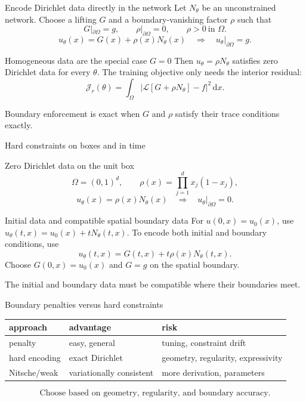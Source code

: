 \documentclass[aspectratio=43,11pt]{beamer}
\newcommand{\slideid}{L3}
\newcommand{\dd}{\,\mathrm d}
\newcommand{\Lop}{\mathcal{L}}
\newcommand{\Loss}{\mathcal{J}}
\newcommand{\labnote}[1]{{\scriptsize\color{courseBlue}#1\par}}
\begin{document}
\renewcommand{\slideid}{L3-S049}
\begin{frame}[c]{Encode Dirichlet data directly in the network}
\small
Let $N_\theta$ be an unconstrained network. Choose a lifting $G$ and a
boundary-vanishing factor $\rho$ such that
\[
G|_{\partial\Omega}=g,\qquad \rho|_{\partial\Omega}=0,
\qquad \rho>0\ \text{in }\Omega.
\]
\[
\boxed{u_\theta(x)=G(x)+\rho(x)N_\theta(x)}
\quad\Longrightarrow\quad u_\theta|_{\partial\Omega}=g.
\]
\begin{block}{Homogeneous data are the special case $G=0$}
Then $u_\theta=\rho N_\theta$ satisfies zero Dirichlet data for every $\theta$.
The training objective only needs the interior residual:
\[
\Loss_r(\theta)=\int_\Omega
|\Lop[G+\rho N_\theta]-f|^2\dd x.
\]
\end{block}
\labnote{Boundary enforcement is exact when $G$ and $\rho$ satisfy their trace conditions exactly.}
\end{frame}

\renewcommand{\slideid}{L3-S052}
\begin{frame}[c]{Hard constraints on boxes and in time}
\small
\begin{block}{Zero Dirichlet data on the unit box}
\[
\Omega=(0,1)^d,\qquad \rho(x)=\prod_{j=1}^d x_j(1-x_j),
\]
\[
u_\theta(x)=\rho(x)N_\theta(x)\quad\Longrightarrow\quad
u_\theta|_{\partial\Omega}=0.
\]
\end{block}
\begin{block}{Initial data and compatible spatial boundary data}
For $u(0,x)=u_0(x)$, use $u_\theta(t,x)=u_0(x)+tN_\theta(t,x)$.
To encode both initial and boundary conditions, use
\[
u_\theta(t,x)=G(t,x)+t\rho(x)N_\theta(t,x).
\]
Choose $G(0,x)=u_0(x)$ and $G=g$ on the spatial boundary.
\end{block}
\labnote{The initial and boundary data must be compatible where their boundaries meet.}
\end{frame}

\renewcommand{\slideid}{L3-S055}
\begin{frame}[c]{Boundary penalties versus hard constraints}
\small
\begin{center}
\footnotesize
\begin{tabular}{lll}
\toprule
approach & advantage & risk \\
\midrule
penalty & easy, general & tuning, constraint drift \\
hard encoding & exact Dirichlet & geometry, regularity, expressivity \\
Nitsche/weak & variationally consistent & more derivation, parameters \\
\bottomrule
\end{tabular}
\end{center}
\[
\text{Choose based on geometry, regularity, and boundary accuracy.}
\]
\end{frame}
\end{document}
